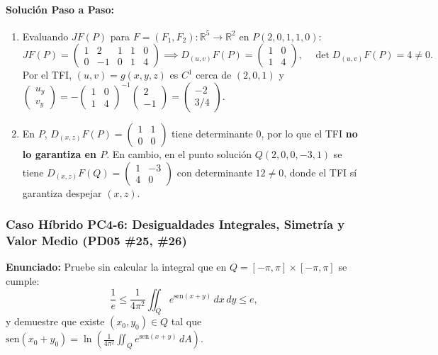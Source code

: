 \documentclass[11pt,a4paper]{article}
\begin{document}
\paragraph{Solución Paso a Paso:}
\begin{enumerate}[label=\textbf{\alph*)}]
  \item Evaluando $JF(P)$ para $F=(F_1,F_2): \mathbb{R}^5 \to \mathbb{R}^2$ en $P(2,0,1,1,0)$:
  \[ JF(P) = \begin{pmatrix} 1 & 2 & 1 & 1 & 0 \\ 0 & -1 & 0 & 1 & 4 \end{pmatrix} \implies D_{(u,v)}F(P) = \begin{pmatrix} 1 & 0 \\ 1 & 4 \end{pmatrix}, \quad \det D_{(u,v)}F(P) = 4 \neq 0. \]
  Por el TFI, $(u,v) = g(x,y,z)$ es $C^1$ cerca de $(2,0,1)$ y $\begin{pmatrix} u_y \\ v_y \end{pmatrix} = -\begin{pmatrix} 1 & 0 \\ 1 & 4 \end{pmatrix}^{-1}\begin{pmatrix} 2 \\ -1 \end{pmatrix} = \begin{pmatrix} -2 \\ 3/4 \end{pmatrix}$.
  \item En $P$, $D_{(x,z)}F(P) = \begin{pmatrix} 1 & 1 \\ 0 & 0 \end{pmatrix}$ tiene determinante $0$, por lo que el TFI \textbf{no lo garantiza en $P$}. En cambio, en el punto solución $Q(2, 0, 0, -3, 1)$ se tiene $D_{(x,z)}F(Q) = \begin{pmatrix} 1 & -3 \\ 4 & 0 \end{pmatrix}$ con determinante $12 \neq 0$, donde el TFI sí garantiza despejar $(x,z)$.
\end{enumerate}

\subsubsection*{Caso Híbrido PC4-6: Desigualdades Integrales, Simetría y Valor Medio (PD05 \#25, \#26)}
\begin{tcolorbox}[colback=white,colframe=gray!40,arc=1mm,boxrule=0.5pt]
\textbf{Enunciado:} Pruebe sin calcular la integral que en $Q = [-\pi,\pi]\times[-\pi,\pi]$ se cumple:
\[ \frac{1}{e} \le \frac{1}{4\pi^2} \iint_Q e^{\text{sen}(x+y)} \, dx \, dy \le e, \]
y demuestre que existe $(x_0, y_0) \in Q$ tal que $\text{sen}(x_0+y_0) = \ln\left(\frac{1}{4\pi^2}\iint_Q e^{\text{sen}(x+y)}\,dA\right)$.
\end{tcolorbox}
\end{document}
